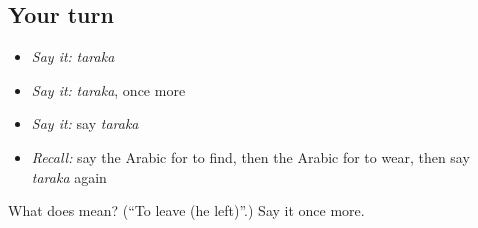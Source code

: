 \subsection*{Your turn}
\begin{itemize}
\raggedright
  \item \emph{Say it:} \emph{taraka}
  \item \emph{Say it:} \emph{taraka}, once more
  \item \emph{Say it:} say \emph{taraka}
  \item \emph{Recall:} say the Arabic for to find, then the Arabic for to wear, then say \emph{taraka} again
\end{itemize}

\begin{tcolorbox}[breakable,colback=teal!4,colframe=teal!35!black,title={Before you move on}]
What does  mean? (\textquotedblleft{}To leave (he left)\textquotedblright{}.) Say it once more.
\end{tcolorbox}
